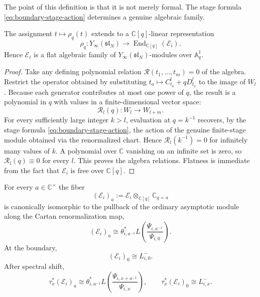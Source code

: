 The point of this definition is that it is not merely formal. The stage
formula \eqref{eq:boundary-stage-action} determines a genuine algebraic
family.

\begin{theorem}
\ClaimStatusProvedHere
\label{thm:algebraicity-baxter-rees-family}
The assignment $t\mapsto \rho_q(t)$ extends to a
$\mathbb C[q]$-linear representation
\begin{equation}
\rho_q:Y_\infty(\mathfrak{sl}_N)
\longrightarrow
\operatorname{End}_{\mathbb C[q]}(\mathcal E_i).
\end{equation}
Hence $\mathcal E_i$ is a flat algebraic family of
$Y_\infty(\mathfrak{sl}_N)$-modules over $\mathbb A^1_q$.
\end{theorem}

\begin{proof}
Take any defining polynomial relation
$\mathscr R(t_1,\dots,t_m)=0$ of the algebra. Restrict the operator
obtained by substituting $t_a\mapsto C_{t_a}^l+qD_{t_a}^l$ to the image of
$W_l$. Because each generator contributes at most one power of $q$, the
result is a polynomial in $q$ with values in a finite-dimensional vector
space:
\begin{equation}
\mathscr R_l(q):W_l\longrightarrow W_{l+m}.
\end{equation}
For every sufficiently large integer $k>l$, evaluation at $q=k^{-1}$
recovers, by the stage formula \eqref{eq:boundary-stage-action}, the
action of the genuine finite-stage module obtained via the renormalized
chart. Hence $\mathscr R_l(k^{-1})=0$ for infinitely
many values of $k$. A polynomial over $\mathbb C$ vanishing on an
infinite set is zero, so $\mathscr R_l(q)\equiv 0$ for every $l$. This
proves the algebra relations. Flatness is immediate from the fact that
$\mathcal E_i$ is free over $\mathbb C[q]$.
\end{proof}

\begin{theorem}
\ClaimStatusProvedHere
\label{thm:generic-and-boundary-fibers}
For every $a\in \mathbb C^\times$ the fiber
\begin{equation}
(\mathcal E_i)_a:=\mathcal E_i\otimes_{\mathbb C[q]}\mathbb C_{q=a}
\end{equation}
is canonically isomorphic to the pullback of the ordinary asymptotic
module along the Cartan renormalization map,
\begin{equation}
(\mathcal E_i)_a
\cong
\theta_{i,a^{-1}}^*L\!\left(\frac{\Psi_{i,a^{-1}}}{\Psi_{i,0}}\right).
\end{equation}
At the boundary,
\begin{equation}
(\mathcal E_i)_0\cong L^-_{i,0}.
\end{equation}
After spectral shift,
\begin{equation}
\tau_x^*(\mathcal E_i)_a
\cong
\theta_{i,a^{-1}}^*L\!\left(\frac{\Psi_{i,x+a^{-1}}}{\Psi_{i,x}}\right),
\qquad
\tau_x^*(\mathcal E_i)_0\cong L^-_{i,x}.
\end{equation}
\end{theorem}

